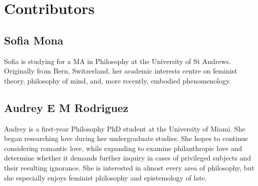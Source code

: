 \chapter{Contributors}

\section*{Sofia Mona}

Sofia is studying for a MA in Philosophy at the University of St
Andrews. Originally from Bern, Switzerland, her academic interests
centre on feminist theory, philosophy of mind, and, more recently,
embodied phenomenology.

\section*{Audrey E M Rodriguez}

Audrey is a first-year Philosophy PhD student at the University of
Miami. She began researching love during her undergraduate studies.
She hopes to continue considering romantic love, while expanding to
examine philanthropic love and determine whether it demands further
inquiry in cases of privileged subjects and their resulting ignorance.
She is interested in almost every area of philosophy, but she
especially enjoys feminist philosophy and epistemology of late.
